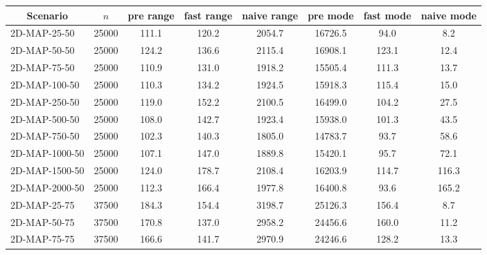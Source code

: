 \documentclass{article}
\begin{document}
\begin{center}
    \begin{table}[h]
        \begin{tabular}{|l||c|c|c|c|c|c|c|}
            \hline
            \multicolumn{1}{|c|}{Scenario} & $n$   & pre range & fast range & naive range & pre mode & fast mode & naive mode \\
            \hline
            \hline
            2D-MAP-25-50                   & 25000 & 111.1     & 120.2      & 2054.7      & 16726.5  & 94.0      & 8.2        \\
            2D-MAP-50-50                   & 25000 & 124.2     & 136.6      & 2115.4      & 16908.1  & 123.1     & 12.4       \\
            2D-MAP-75-50                   & 25000 & 110.9     & 131.0      & 1918.2      & 15505.4  & 111.3     & 13.7       \\
            2D-MAP-100-50                  & 25000 & 110.3     & 134.2      & 1924.5      & 15918.3  & 115.4     & 15.0       \\
            2D-MAP-250-50                  & 25000 & 119.0     & 152.2      & 2100.5      & 16499.0  & 104.2     & 27.5       \\
            2D-MAP-500-50                  & 25000 & 108.0     & 142.7      & 1923.4      & 15938.0  & 101.3     & 43.5       \\
            2D-MAP-750-50                  & 25000 & 102.3     & 140.3      & 1805.0      & 14783.7  & 93.7      & 58.6       \\
            2D-MAP-1000-50                 & 25000 & 107.1     & 147.0      & 1889.8      & 15420.1  & 95.7      & 72.1       \\
            2D-MAP-1500-50                 & 25000 & 124.0     & 178.7      & 2108.4      & 16203.9  & 114.7     & 116.3      \\
            2D-MAP-2000-50                 & 25000 & 112.3     & 166.4      & 1977.8      & 16400.8  & 93.6      & 165.2      \\
            \hline
            2D-MAP-25-75                   & 37500 & 184.3     & 154.4      & 3198.7      & 25126.3  & 156.4     & 8.7        \\
            2D-MAP-50-75                   & 37500 & 170.8     & 137.0      & 2958.2      & 24456.6  & 160.0     & 11.2       \\
            2D-MAP-75-75                   & 37500 & 166.6     & 141.7      & 2970.9      & 24246.6  & 128.2     & 13.3       \\

\end{tabular}
\end{table}
\end{center}
\end{document}
